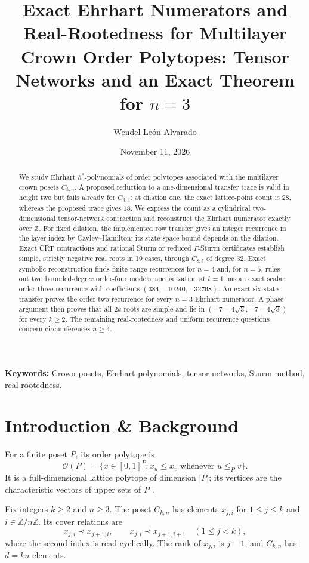 \documentclass[11pt,a4paper]{article}
\title{Exact Ehrhart Numerators and Real-Rootedness for Multilayer Crown Order Polytopes: Tensor Networks and an Exact Theorem for $n=3$}
\author{Wendel León Alvarado}
\date{November 11, 2026}
\theoremstyle{definition}
\begin{document}
\maketitle

\begin{abstract}
We study Ehrhart $h^*$-polynomials of order polytopes associated with the multilayer crown posets $C_{k,n}$. A proposed reduction to a one-dimensional transfer trace is valid in height two but fails already for $C_{3,3}$: at dilation one, the exact lattice-point count is $28$, whereas the proposed trace gives $18$. We express the count as a cylindrical two-dimensional tensor-network contraction and reconstruct the Ehrhart numerator exactly over $\mathbb{Z}$. For fixed dilation, the implemented row transfer gives an integer recurrence in the layer index by Cayley--Hamilton; its state-space bound depends on the dilation. Exact CRT contractions and rational Sturm or reduced $\Gamma$-Sturm certificates establish simple, strictly negative real roots in 19 cases, through $C_{8,5}$ of degree 32. Exact symbolic reconstruction finds finite-range recurrences for $n=4$ and, for $n=5$, rules out two bounded-degree order-four models; specialization at $t=1$ has an exact scalar order-three recurrence with coefficients $(384,-10240,-32768)$. An exact six-state transfer proves the order-two recurrence for every $n=3$ Ehrhart numerator. A phase argument then proves that all $2k$ roots are simple and lie in $(-7-4\sqrt3,-7+4\sqrt3)$ for every $k\ge2$. The remaining real-rootedness and uniform recurrence questions concern circumferences $n\ge4$.
\end{abstract}

\small\noindent\textbf{Keywords:} Crown posets, Ehrhart polynomials, tensor networks, Sturm method, real-rootedness.
\normalsize

\section{Introduction \& Background}

For a finite poset $P$, its order polytope is
\begin{equation}
\mathcal{O}(P)=\{x\in[0,1]^P : x_u\le x_v\text{ whenever }u\le_P v\}.
\end{equation}
It is a full-dimensional lattice polytope of dimension $|P|$; its vertices are the characteristic vectors of upper sets of $P$ \cite{Stanley1986}.

Fix integers $k\ge2$ and $n\ge3$. The poset $C_{k,n}$ has elements $x_{j,i}$ for $1\le j\le k$ and $i\in\mathbb{Z}/n\mathbb{Z}$. Its cover relations are
\begin{equation}
x_{j,i}\prec x_{j+1,i},\qquad x_{j,i}\prec x_{j+1,i+1}
\quad (1\le j<k),
\end{equation}
where the second index is read cyclically. The rank of $x_{j,i}$ is $j-1$, and $C_{k,n}$ has $d=kn$ elements.
\end{document}

